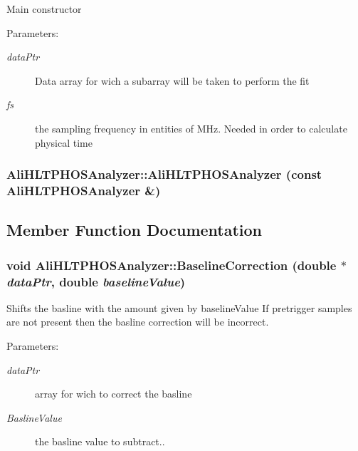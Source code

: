 Main constructor \begin{Desc}
\item[Parameters:]
\begin{description}
\item[{\em data\-Ptr}]Data array for wich a subarray will be taken to perform the fit \item[{\em fs}]the sampling frequency in entities of MHz. Needed in order to calculate physical time \end{description}
\end{Desc}
\subsubsection{\setlength{\rightskip}{0pt plus 5cm}Ali\-HLTPHOSAnalyzer::Ali\-HLTPHOSAnalyzer (const {\bf Ali\-HLTPHOSAnalyzer} \&)}\label{classAliHLTPHOSAnalyzer_a3}




\subsection{Member Function Documentation}
\subsubsection{\setlength{\rightskip}{0pt plus 5cm}void Ali\-HLTPHOSAnalyzer::Baseline\-Correction (double $\ast$ {\em data\-Ptr}, double {\em baseline\-Value})}\label{classAliHLTPHOSAnalyzer_a6}


Shifts the basline with the amount given by baseline\-Value If pretrigger samples are not present then the basline correction will be incorrect. \begin{Desc}
\item[Parameters:]
\begin{description}
\item[{\em data\-Ptr}]array for wich to correct the basline \item[{\em Basline\-Value}]the basline value to subtract.. \end{description}
\end{Desc}
